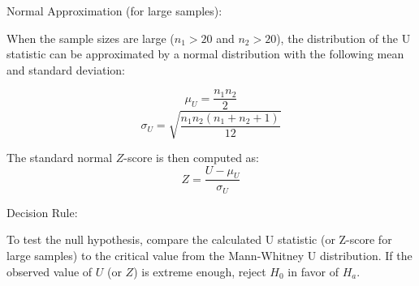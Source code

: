 \documentclass[conference]{IEEEtran}
\begin{document}
Normal Approximation (for large samples):

When the sample sizes are large (\(n_1 > 20\) and \(n_2 > 20\)), the distribution of the U statistic can be approximated by a normal distribution with the following mean and standard deviation:

\[
\mu_U = \frac{n_1 n_2}{2}
\]
\[
\sigma_U = \sqrt{\frac{n_1 n_2 (n_1 + n_2 + 1)}{12}}
\]

The standard normal \( Z \)-score is then computed as:
\[
Z = \frac{U - \mu_U}{\sigma_U}
\]

Decision Rule:

To test the null hypothesis, compare the calculated U statistic (or Z-score for large samples) to the critical value from the Mann-Whitney U distribution. If the observed value of \( U \) (or \( Z \)) is extreme enough, reject \( H_0 \) in favor of \( H_a \).


\newpage


\end{document}
